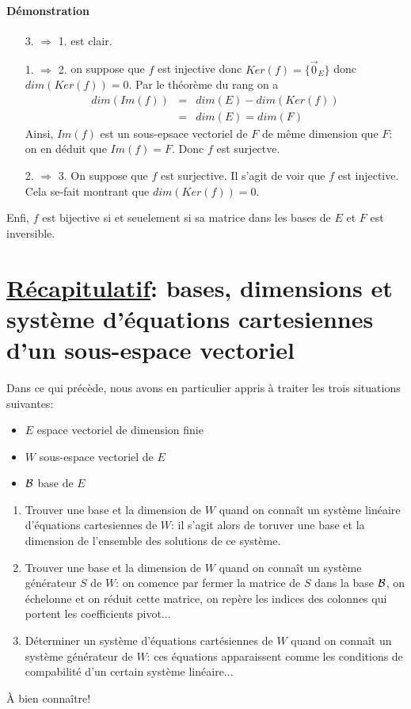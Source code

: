 \paragraph{Démonstration} 
\begin{itemize}
  \item[3. $\Rightarrow$ 1.] est clair.
  \item[1. $\Rightarrow$ 2.] on suppose que $f$ est injective donc $Ker(f) = \{\vec{0}_E\}$ donc $dim(Ker(f)) = 0$. Par le théorème du rang on a
    \begin{eqnarray*}
      dim(Im(f)) &=& dim(E) - dim(Ker(f)) \\
        &=& dim(E) = dim(F)
    \end{eqnarray*}
    Ainsi, $Im(f)$ est un sous-epsace vectoriel de $F$ de même dimension que $F$: on en déduit que $Im(f) = F$. Donc $f$ est surjectve.
  \item[2. $ \Rightarrow$ 3.] On suppose que $f$ est surjective. Il s'agit de voir que $f$ est injective. Cela se-fait montrant que $dim(Ker(f)) = 0$. 
\end{itemize}
Enfi, $f$ est bijective si et seuelement si sa matrice dans les bases de $E$ et $F$ est inversible.

%
%
\section[Récapitulatif]{\underline{Récapitulatif}: bases, dimensions et système d'équations cartesiennes d'un sous-espace vectoriel}
%
%
Dans ce qui précède, nous avons en particulier appris à traiter les trois situations suivantes:
\begin{itemize}
  \item $E$ espace vectoriel de dimension finie
  \item $W$ sous-espace vectoriel de $E$
  \item $\mathcal{B}$ base de $E$
\end{itemize}

\begin{enumerate}
  \item Trouver une base et la dimension de $W$ quand on  connaît un système linéaire d'équations cartesiennes de $W$: il s'agit alors de toruver une base et la dimension de l'ensemble des solutions de ce système.
  \item Trouver une base et la dimension de $W$ quand on connaît un système générateur $S$ de $W$: on comence par fermer la matrice de $S$ dans la base $\mathcal{B}$, on échelonne et on réduit cette matrice, on repère les indices des colonnes qui portent les coefficients pivot...
  \item Déterminer un système d'équations cartésiennes de $W$ quand on connaît un système générateur de $W$: ces équations apparaissent comme les conditions de compabilité d'un certain système linéaire...
\end{enumerate}
À bien connaître!
